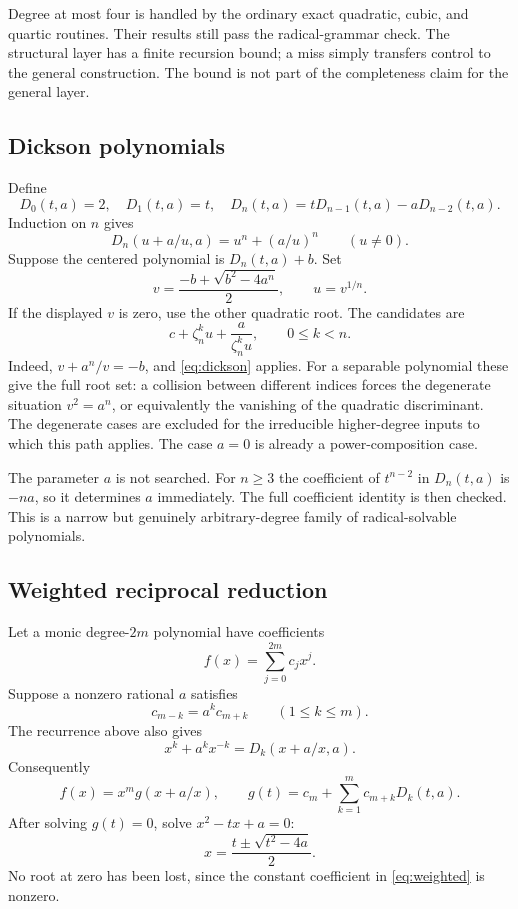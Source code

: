 \documentclass[11pt,a4paper]{article}
\theoremstyle{definition}
\theoremstyle{remark}
\newcommand{\z}{\zeta}
\begin{document}
Degree at most four is handled by the ordinary exact quadratic, cubic, and
quartic routines. Their results still pass the radical-grammar check. The
structural layer has a finite recursion bound; a miss simply transfers control
to the general construction. The bound is not part of the completeness claim
for the general layer.

\subsection{Dickson polynomials}
Define
\[
 D_0(t,a)=2,\quad D_1(t,a)=t,\quad
 D_n(t,a)=tD_{n-1}(t,a)-aD_{n-2}(t,a).
\]
Induction on $n$ gives
\begin{equation}\label{eq:dickson}
 D_n(u+a/u,a)=u^n+(a/u)^n \qquad (u\ne0).
\end{equation}
Suppose the centered polynomial is $D_n(t,a)+b$. Set
\begin{equation}\label{eq:dickson-radicals}
 v=\frac{-b+\sqrt{b^2-4a^n}}2,\qquad u=v^{1/n}.
\end{equation}
If the displayed $v$ is zero, use the other quadratic root. The candidates are
\begin{equation}\label{eq:dickson-roots}
 c+\z_n^k u+\frac{a}{\z_n^k u},\qquad 0\leq k<n.
\end{equation}
Indeed, $v+a^n/v=-b$, and \eqref{eq:dickson} applies. For a separable polynomial
these give the full root set: a collision between different indices forces the
degenerate situation $v^2=a^n$, or equivalently the vanishing of the quadratic
discriminant. The degenerate cases are excluded for the irreducible
higher-degree inputs to which this path applies. The case $a=0$ is already a
power-composition case.

The parameter $a$ is not searched. For $n\geq3$ the coefficient of $t^{n-2}$ in
$D_n(t,a)$ is $-na$, so it determines $a$ immediately. The full coefficient
identity is then checked. This is a narrow but genuinely arbitrary-degree
family of radical-solvable polynomials.

\subsection{Weighted reciprocal reduction}
Let a monic degree-$2m$ polynomial have coefficients
\[
 f(x)=\sum_{j=0}^{2m} c_jx^j.
\]
Suppose a nonzero rational $a$ satisfies
\begin{equation}\label{eq:weighted}
 c_{m-k}=a^k c_{m+k}\qquad(1\leq k\leq m).
\end{equation}
The recurrence above also gives
\[
 x^k+a^kx^{-k}=D_k(x+a/x,a).
\]
Consequently
\begin{equation}\label{eq:reciprocal}
 f(x)=x^m g(x+a/x),\qquad
 g(t)=c_m+\sum_{k=1}^m c_{m+k}D_k(t,a).
\end{equation}
After solving $g(t)=0$, solve $x^2-tx+a=0$:
\begin{equation}\label{eq:quadratic-lift}
 x=\frac{t\pm\sqrt{t^2-4a}}2.
\end{equation}
No root at zero has been lost, since the constant coefficient in
\eqref{eq:weighted} is nonzero.
\end{document}
